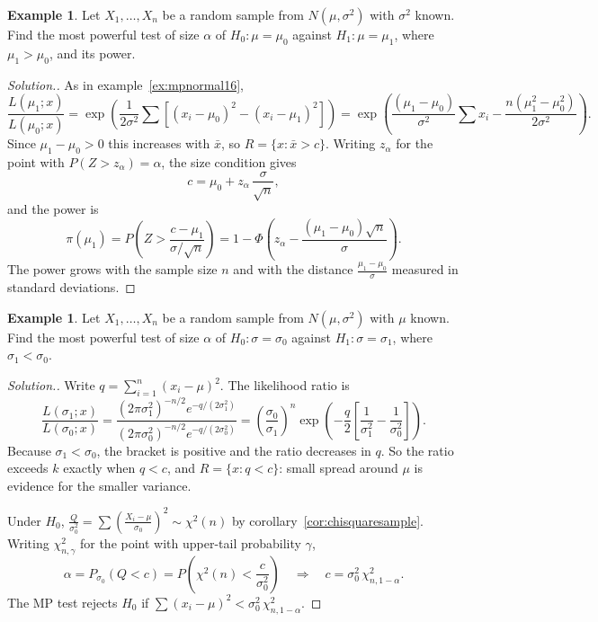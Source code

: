 \documentclass[12pt,a4paper]{report}
\theoremstyle{definition}
\newtheorem{example}[thm]{Example}
\theoremstyle{plain}
\newenvironment{solution}
  {\renewcommand{\qedsymbol}{}\begin{proof}[\textit{Solution}.]}
  {\end{proof}}
\begin{document}
\begin{example}
\label{ex:mpnormalgeneral}
Let $X_1,\dots,X_n$ be a random sample from $N(\mu,\sigma^2)$ with $\sigma^2$
known. Find the most powerful test of size $\alpha$ of $H_0\colon\mu = \mu_0$
against $H_1\colon\mu = \mu_1$, where $\mu_1>\mu_0$, and its power.
\end{example}

\begin{solution}
As in example~\ref{ex:mpnormal16},
\[\frac{L(\mu_1;x)}{L(\mu_0;x)}
= \exp\left(\frac{1}{2\sigma^2}\sum\left[(x_i - \mu_0)^2 - (x_i - \mu_1)^2\right]\right)
= \exp\left(\frac{(\mu_1 - \mu_0)}{\sigma^2}\sum x_i - \frac{n(\mu_1^2 - \mu_0^2)}{2\sigma^2}\right).\]
Since $\mu_1 - \mu_0>0$ this increases with $\bar x$, so $R = \{x : \bar x>c\}$.
Writing $z_\alpha$ for the point with $P(Z>z_\alpha) = \alpha$, the size condition
gives
\[c = \mu_0 + z_\alpha\,\frac{\sigma}{\sqrt n} ,\]
and the power is
\[\pi(\mu_1) = P\left(Z>\frac{c - \mu_1}{\sigma/\sqrt n}\right)
= 1 - \Phi\left(z_\alpha - \frac{(\mu_1 - \mu_0)\sqrt n}{\sigma}\right).\]
The power grows with the sample size $n$ and with the distance
$\frac{\mu_1 - \mu_0}{\sigma}$ measured in standard deviations.
\end{solution}

\begin{example}
\label{ex:mpvariance}
Let $X_1,\dots,X_n$ be a random sample from $N(\mu,\sigma^2)$ with $\mu$ known.
Find the most powerful test of size $\alpha$ of $H_0\colon\sigma = \sigma_0$
against $H_1\colon\sigma = \sigma_1$, where $\sigma_1<\sigma_0$.
\end{example}

\begin{solution}
Write $q = \sum_{i=1}^n (x_i - \mu)^2$. The likelihood ratio is
\[\frac{L(\sigma_1;x)}{L(\sigma_0;x)}
= \frac{(2\pi\sigma_1^2)^{-n/2} e^{-q/(2\sigma_1^2)}}{(2\pi\sigma_0^2)^{-n/2} e^{-q/(2\sigma_0^2)}}
= \left(\frac{\sigma_0}{\sigma_1}\right)^n
\exp\left(-\frac{q}{2}\left[\frac{1}{\sigma_1^2} - \frac{1}{\sigma_0^2}\right]\right).\]
Because $\sigma_1<\sigma_0$, the bracket is positive and the ratio decreases in
$q$. So the ratio exceeds $k$ exactly when $q<c$, and $R = \{x : q<c\}$: small
spread around $\mu$ is evidence for the smaller variance.

Under $H_0$, $\frac{Q}{\sigma_0^2} = \sum\left(\frac{X_i - \mu}{\sigma_0}\right)^2
\sim\chi^2(n)$ by corollary~\ref{cor:chisquaresample}. Writing $\chi^2_{n,\gamma}$
for the point with upper-tail probability $\gamma$,
\[\alpha = P_{\sigma_0}(Q<c) = P\left(\chi^2(n)<\frac{c}{\sigma_0^2}\right)
\quad\Longrightarrow\quad c = \sigma_0^2\,\chi^2_{n,1-\alpha} .\]
The MP test rejects $H_0$ if $\sum (x_i - \mu)^2<\sigma_0^2\,\chi^2_{n,1-\alpha}$.
\end{solution}
\end{document}
